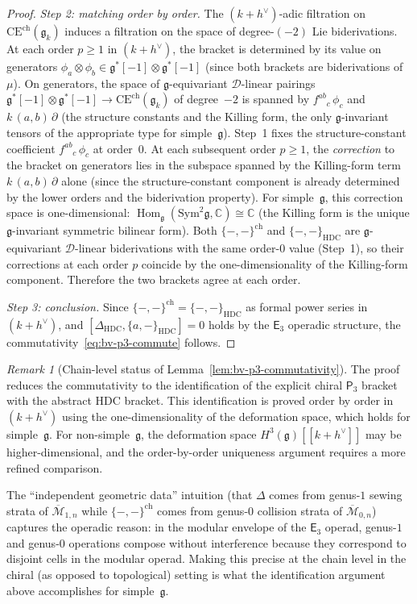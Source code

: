 \documentclass[11pt,reqno]{amsart}
\theoremstyle{definition}
\theoremstyle{remark}
\newtheorem{remark}[theorem]{Remark}
\newcommand{\cD}{\mathcal{D}}
\newcommand{\cM}{\mathcal{M}}
\newcommand{\CE}{\mathrm{CE}}
\newcommand{\Ethree}{\mathsf{E}_{3}}
\newcommand{\Pthree}{\mathsf{P}_{3}}
\newcommand{\Sym}{\mathrm{Sym}}
\DeclareMathOperator{\Hom}{Hom}
\newcommand{\fg}{\mathfrak{g}}
\newcommand{\CC}{\mathbb{C}}
\numberwithin{equation}{section}
\begin{document}
\begin{proof}
\textit{Step 2: matching order by order.}
The $(k+h^\vee)$-adic filtration on
$\CE^{\mathrm{ch}}(\fg_k)$ induces a filtration on the
space of degree-$(-2)$ Lie biderivations. At each order
$p \geq 1$ in $(k+h^\vee)$, the bracket is determined by
its value on generators
$\phi_a \otimes \phi_b \in \fg^*[-1] \otimes \fg^*[-1]$
(since both brackets are biderivations of $\mu$). On
generators, the space of $\fg$-equivariant $\cD$-linear
pairings $\fg^*[-1] \otimes \fg^*[-1] \to
\CE^{\mathrm{ch}}(\fg_k)$ of degree~$-2$ is spanned by
$f^{ab}{}_c\,\phi_c$ and $k\,(a,b)\,\partial$ (the
structure constants and the Killing form, the only
$\fg$-invariant tensors of the appropriate type for
simple~$\fg$). Step~1 fixes the structure-constant coefficient
$f^{ab}{}_c\,\phi_c$ at order~$0$.  At each subsequent
order $p \geq 1$, the \emph{correction} to the bracket on
generators lies in the subspace spanned by the Killing-form
term $k\,(a,b)\,\partial$ alone (since the
structure-constant component is already determined by
the lower orders and the biderivation property).
For simple~$\fg$, this correction space is
one-dimensional: $\Hom_\fg(\Sym^2\fg, \CC) \cong \CC$
(the Killing form is the unique $\fg$-invariant symmetric
bilinear form).  Both $\{-,-\}^{\mathrm{ch}}$ and
$\{-,-\}_{\mathrm{HDC}}$ are $\fg$-equivariant
$\cD$-linear biderivations with the same
order-$0$ value (Step~1), so their corrections at each
order $p$ coincide by the one-dimensionality of the
Killing-form component.  Therefore the two brackets agree
at each order.

\textit{Step 3: conclusion.}
Since $\{-,-\}^{\mathrm{ch}} = \{-,-\}_{\mathrm{HDC}}$
as formal power series in $(k+h^\vee)$, and
$[\Delta_{\mathrm{HDC}}, \{a,-\}_{\mathrm{HDC}}] = 0$
holds by the $\Ethree$ operadic structure,
the commutativity~\eqref{eq:bv-p3-commute} follows.
\end{proof}

\begin{remark}[Chain-level status of
Lemma~\ref{lem:bv-p3-commutativity}]
\label{rem:bv-p3-chain-level}
The proof reduces the commutativity to the identification
of the explicit chiral $\Pthree$ bracket with the abstract
HDC bracket. This identification is proved order by order
in $(k+h^\vee)$ using the one-dimensionality of the
deformation space, which holds for simple~$\fg$.
For non-simple~$\fg$, the deformation space
$H^3(\fg)[[k+h^\vee]]$ may be higher-dimensional, and the
order-by-order uniqueness argument requires a more refined
comparison.

The ``independent geometric data'' intuition (that
$\Delta$ comes from genus-$1$ sewing strata of
$\overline{\cM}_{1,n}$ while
$\{-,-\}^{\mathrm{ch}}$ comes from genus-$0$ collision
strata of $\overline{\cM}_{0,n}$) captures the operadic
reason: in the modular envelope of the $\Ethree$ operad,
genus-$1$ and genus-$0$ operations compose without
interference because they correspond to disjoint cells
in the modular operad. Making this precise at the
chain level in the chiral (as opposed to topological)
setting is what the identification argument above
accomplishes for simple~$\fg$.
\end{remark}
\end{document}
